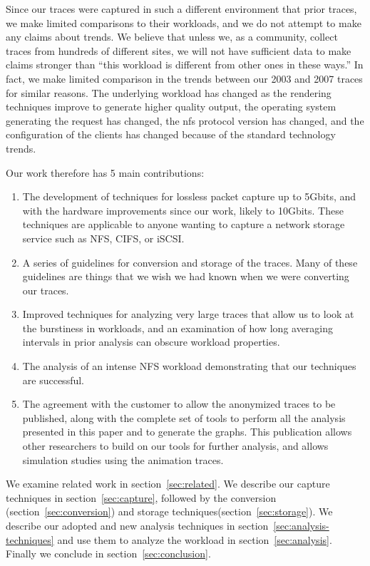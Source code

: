 Since our traces were captured in such a different environment that
prior traces, we make limited comparisons to their workloads, and we
do not attempt to make any claims about trends.  We believe that
unless we, as a community, collect traces from hundreds of different
sites, we will not have sufficient data to make claims stronger than
``this workload is different from other ones in these ways.''  In
fact, we make limited comparison in the trends between our 2003 and
2007 traces for similar reasons.  The underlying workload has changed
as the rendering techniques improve to generate higher quality output,
the operating system generating the request has changed, the nfs
protocol version has changed, and the configuration of the clients has
changed because of the standard technology trends.

Our work therefore has 5 main contributions:

\begin{enumerate}
\item The development of techniques for lossless packet capture up to
5Gbits, and with the hardware improvements since our work, likely to
10Gbits.  These techniques are applicable to anyone wanting to capture
a network storage service such as NFS, CIFS, or iSCSI.

\item A series of guidelines for conversion and storage of the traces.
Many of these guidelines are things that we wish we had known when we
were converting our traces.

\item Improved techniques for analyzing very large traces that allow
us to look at the burstiness in workloads, and an examination of how
long averaging intervals in prior analysis can obscure workload
properties.

\item The analysis of an intense NFS workload demonstrating that our
techniques are successful.

\item The agreement with the customer to allow the anonymized traces
to be published, along with the complete set of tools to perform all
the analysis presented in this paper and to generate the graphs.  This
publication allows other researchers to build on our tools for further
analysis, and allows simulation studies using the animation traces.
\end{enumerate}

We examine related work in section~\ref{sec:related}.  We describe our
capture techniques in section~\ref{sec:capture}, followed by the
conversion (section~\ref{sec:conversion}) and storage
techniques(section~\ref{sec:storage}).  We describe our adopted and
new analysis techniques in section~\ref{sec:analysis-techniques} and
use them to analyze the workload in section~\ref{sec:analysis}.
Finally we conclude in section~\ref{sec:conclusion}.
